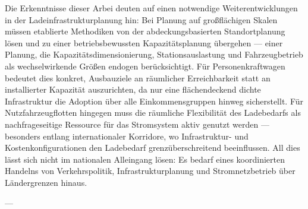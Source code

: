 Die Erkenntnisse dieser Arbei deuten auf einen notwendige Weiterentwicklungen in der Ladeinfrastrukturplanung hin: Bei Planung auf großflächigen Skalen müssen etablierte Methodiken von der abdeckungsbasierten Standortplanung lösen und zu einer betriebsbewussten Kapazitätsplanung übergehen --- einer Planung, die Kapazitätsdimensionierung, Stationsauslastung und Fahrzeugbetrieb als wechselwirkende Größen endogen berücksichtigt. Für Personenkraftwagen bedeutet dies konkret, Ausbauziele an räumlicher Erreichbarkeit statt an installierter Kapazität auszurichten, da nur eine flächendeckend dichte Infrastruktur die Adoption über alle Einkommensgruppen hinweg sicherstellt. Für Nutzfahrzeugflotten hingegen muss die räumliche Flexibilität des Ladebedarfs als nachfrageseitige Ressource für das Stromsystem aktiv genutzt werden --- besonders entlang internationaler Korridore, wo Infrastruktur- und Kostenkonfigurationen den Ladebedarf grenzüberschreitend beeinflussen. All dies lässt sich nicht im nationalen Alleingang lösen: Es bedarf eines koordinierten Handelns von Verkehrspolitik, Infrastrukturplanung und Stromnetzbetrieb über Ländergrenzen hinaus.

---